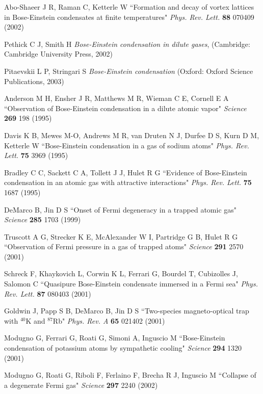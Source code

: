 \documentclass[pra,letterpaper,twocolumn,showpacs,superscriptaddress]{revtex4}
\begin{document}
\begin{thebibliography}{300}
 Abo-Shaeer J R, Raman C, Ketterle W 
``Formation and decay of vortex lattices in Bose-Einstein condensates at finite temperatures"
{\it Phys. Rev. Lett.} \textbf{88} 070409 (2002)

 Pethick C J, Smith H {\it Bose-Einstein condensation in dilute gases}, 
(Cambridge: Cambridge University Press, 2002) 

 Pitaevskii L P, Stringari S {\it Bose-Einstein condensation} (Oxford: Oxford Science Publications, 2003)

 Anderson M H, Ensher J R, Matthews M R, Wieman C E, Cornell  E A
``Observation of Bose-Einstein condensation in a dilute atomic vapor" {\it Science} \textbf{269} 198 (1995)

 Davis K B, Mewes M-O, Andrews M R, van Druten N J, Durfee D S, Kurn D M, Ketterle W
``Bose-Einstein condensation in a gas of sodium atoms" {\it Phys. Rev. Lett.} \textbf{75} 3969 (1995)

 Bradley C C, Sackett C A, Tollett J J, Hulet R G 
``Evidence of Bose-Einstein condensation in an atomic gas with attractive interactions"
{\it Phys. Rev. Lett.} \textbf{75} 1687 (1995)

 DeMarco B, Jin D S ``Onset of Fermi degeneracy in a trapped atomic gas" {\it Science} \textbf{285} 1703 (1999)

 Truscott A G, Strecker K E, McAlexander W I, Partridge G B, Hulet R G 
``Observation of Fermi pressure in a gas of trapped atoms" {\it Science} \textbf{291} 2570 (2001)

 Schreck F, Khaykovich L, Corwin K L, Ferrari G, Bourdel T, Cubizolles J, Salomon C 
``Quasipure Bose-Einstein condensate immersed in a Fermi sea"
{\it Phys. Rev. Lett.} \textbf{87} 080403 (2001)

 Goldwin J, Papp S B, DeMarco B, Jin D S
``Two-species magneto-optical trap with $^{40}$K and $^{87}$Rb"
{\it Phys. Rev. A} \textbf{65} 021402 (2001)

 Modugno G, Ferrari G, Roati G, Simoni A, Inguscio M
``Bose-Einstein condensation of potassium atoms by sympathetic cooling" 
{\it Science} \textbf{294} 1320 (2001)

 Modugno G, Roati G, Riboli F, Ferlaino F, Brecha R J, Inguscio M 
``Collapse of a degenerate Fermi gas"
{\it Science} \textbf{297} 2240 (2002)


\end{thebibliography}
\end{document}

